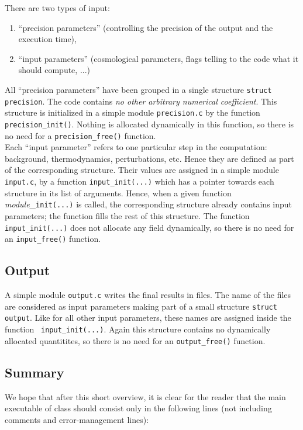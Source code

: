 \documentclass{article}
\begin{document}
There are two types of input:
\begin{enumerate}
\item ``precision parameters'' (controlling the precision of the output and the execution time),
\item ``input parameters'' (cosmological parameters, flags telling to the code what it should compute, ...)
\end{enumerate}
All ``precision parameters'' have been grouped in a single structure
{\tt struct precision}. The code contains {\it no other arbitrary
numerical coefficient}. This structure is initialized in a simple
module {\tt precision.c} by the function {\tt
precision\_init()}. Nothing is allocated dynamically in this function,
so there is no need for a {\tt precision\_free()} function.\\ Each
``input parameter'' refers to one particular step in the computation:
background, thermodynamics, perturbations, etc. Hence they are defined
as part of the corresponding structure. Their values are assigned in a
simple module {\tt input.c}, by a function {\tt input\_init(...)}
which has a pointer towards each structure in its list of
arguments. Hence, when a given function {\it module}\_{\tt init(...)}
is called, the corresponding structure already contains input
parameters; the function fills the rest of this structure. The
function {\tt input\_init(...)} does not allocate any field
dynamically, so there is no need for an {\tt input\_free()} function.

\subsection{Output}

A simple module {\tt output.c} writes the final results in files. The
name of the files are considered as input parameters making part of a
small structure {\tt struct output}.  Like for all other input
parameters, these names are assigned inside the function {\tt
input\_init(...)}. Again this structure contains no dynamically allocated
quantitites, so there is no need for an {\tt output\_free()} function.

\subsection{Summary}

We hope that after this short overview, it is clear for the reader
that the main executable of {\sc class} should consist only in the 
following lines
(not including comments and error-management lines):
\end{document}
